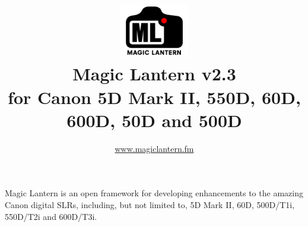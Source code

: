 \documentclass[a4paper,english]{article}
\renewcommand{\href}[2]{\directlua{ShowLink("#1", "#2")}}
\begin{document}
\title{\vspace{-1cm}\includegraphics[width=3cm]{logo-trans.png}\\Magic Lantern v2.3\\{\small for Canon 5D Mark II, 550D, 60D, 600D, 50D and 500D}}
\author{\url{www.magiclantern.fm}}
\maketitle



Magic Lantern is an open framework for developing enhancements to the amazing Canon digital SLRs, including, but not limited to,
5D Mark II, 60D, 500D/T1i, 550D/T2i and 600D/T3i.
\end{document}
